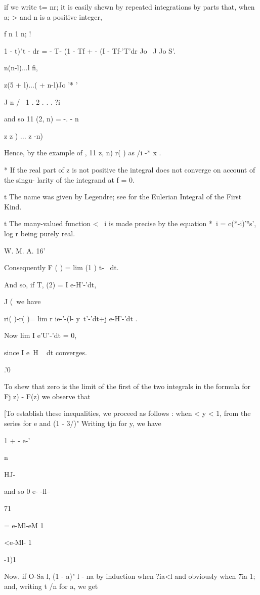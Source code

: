 if we write t= nr; it is easily shewn by repeated integrations by
parts that, when a; > and n is a positive integer,

f n 1 n; !

 1 - t)"t - dr = - T- (1 - Tf + - (I - Tf-'T'dr Jo \ J Jo S'.

n(n-l)...l fi,

z(5 + l)...( + n-l)Jo '* '

J n / \ 1 . 2 . . . ?i

and so 11 (2, n) = -. - n

z z ) ... z -n)

Hence, by the example of , 11 z, n) r( ) as /i -* x .

* If the real part of z is not positive the integral does not converge
on account of the singu- larity of the integrand at f = 0.

t The name was given by Legendre; see  for the Eulerian
Integral of the First Kind.

t The many-valued function < ~i is made precise by the equation *~i =
c(*-i)'°s', log r being purely real.

W. M. A. 16'

%
%

Consequently F ( ) = lim (1 ) t-~ dt.

And so, if T, (2) = I e-H'-'dt,

J (\ we have

ri( )-r( )= lim r ie-'-(l- y\ t'-'dt+j e-H'-'dt .

Now lim I e'U'-'dt = 0,

since I e~H ~ dt converges.

.'0

To shew that zero is the limit of the first of the two integrals in
the formula for Fj z) - F(z) we observe that

[To establish these inequalities, we proceed as follows : when < y <
1, from the series for e and (1 - 3/)" Writing tjn for y, we have

1 + - e-'

n

HJ-

and so 0 e- -fl--

71

= e-Ml-eM 1

<e-Ml- 1

-1)1

Now, if O-Sa l, (1 - a)" l - na by induction when ?ia<l and obviously
when 7ia 1; and, writing t /n for a, we get

